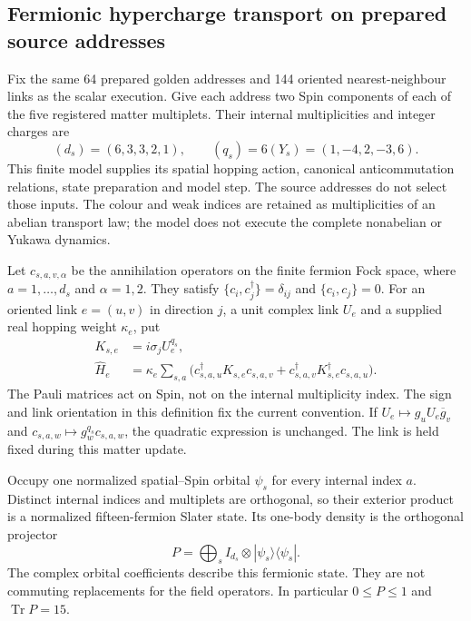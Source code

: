 \subsection{Fermionic hypercharge transport on prepared source addresses}
\label{sec:fermion-source-current}

Fix the same 64 prepared golden addresses and 144 oriented nearest-neighbour
links as the scalar execution. Give each address two Spin components of
each of the five registered matter multiplets. Their internal multiplicities
and integer charges are
\[
 (d_s)=(6,3,3,2,1),\qquad (q_s)=6(Y_s)=(1,-4,2,-3,6).
\]
This finite model supplies its spatial hopping action, canonical
anticommutation relations, state preparation and model step. The source
addresses do not select those inputs. The colour and weak indices are
retained as multiplicities of an abelian transport law; the model does not
execute the complete nonabelian or Yukawa dynamics.

Let $c_{s,a,v,\alpha}$ be the annihilation operators on the finite fermion
Fock space, where $a=1,\ldots,d_s$ and $\alpha=1,2$. They satisfy
$\{c_i,c_j^\dagger\}=\delta_{ij}$ and $\{c_i,c_j\}=0$.
For an oriented link $e=(u,v)$ in direction $j$, a unit complex link $U_e$
and a supplied real hopping weight $\kappa_e$, put
\begin{align}
 K_{s,e}&=i\sigma_j U_e^{q_s},\\
 \widehat H_e&=\kappa_e\sum_{s,a}
 \bigl(c_{s,a,u}^\dagger K_{s,e}c_{s,a,v}
       +c_{s,a,v}^\dagger K_{s,e}^\dagger c_{s,a,u}\bigr).
 \label{eq:fermion-source-edge-action}
\end{align}
The Pauli matrices act on Spin, not on the internal multiplicity index.
The sign and link orientation in this definition fix the current convention.
If $U_e\mapsto g_uU_e\overline g_v$ and
$c_{s,a,w}\mapsto g_w^{q_s}c_{s,a,w}$, the quadratic expression is
unchanged. The link is held fixed during this matter update.

Occupy one normalized spatial--Spin orbital $\psi_s$ for every internal
index $a$. Distinct internal indices and multiplets are orthogonal, so their
exterior product is a normalized fifteen-fermion Slater state. Its one-body
density is the orthogonal projector
\[
 P=\bigoplus_s I_{d_s}\otimes |\psi_s\rangle\langle\psi_s|.
\]
The complex orbital coefficients describe this fermionic state. They are
not commuting replacements for the field operators. In particular
$0\leq P\leq1$ and $\operatorname{Tr}P=15$.

